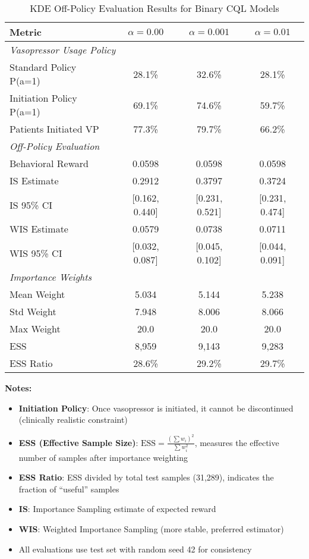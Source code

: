 \documentclass{article}
\begin{document}
\begin{table}[h]
\centering
\caption{KDE Off-Policy Evaluation Results for Binary CQL Models}
\label{tab:kde_ope_results}
\begin{tabular}{@{}lccc@{}}
\toprule
\textbf{Metric} & \textbf{$\alpha=0.00$} & \textbf{$\alpha=0.001$} & \textbf{$\alpha=0.01$} \\
\midrule
\multicolumn{4}{l}{\textit{Vasopressor Usage Policy}} \\
Standard Policy P(a=1) & 28.1\% & 32.6\% & 28.1\% \\
Initiation Policy P(a=1) & 69.1\% & 74.6\% & 59.7\% \\
Patients Initiated VP & 77.3\% & 79.7\% & 66.2\% \\
\midrule
\multicolumn{4}{l}{\textit{Off-Policy Evaluation}} \\
Behavioral Reward & 0.0598 & 0.0598 & 0.0598 \\
IS Estimate & 0.2912 & 0.3797 & 0.3724 \\
IS 95\% CI & [0.162, 0.440] & [0.231, 0.521] & [0.231, 0.474] \\
WIS Estimate & 0.0579 & 0.0738 & 0.0711 \\
WIS 95\% CI & [0.032, 0.087] & [0.045, 0.102] & [0.044, 0.091] \\
\midrule
\multicolumn{4}{l}{\textit{Importance Weights}} \\
Mean Weight & 5.034 & 5.144 & 5.238 \\
Std Weight & 7.948 & 8.006 & 8.066 \\
Max Weight & 20.0 & 20.0 & 20.0 \\
ESS & 8,959 & 9,143 & 9,283 \\
ESS Ratio & 28.6\% & 29.2\% & 29.7\% \\
\bottomrule
\end{tabular}
\end{table}

\bigskip

\textbf{Notes:}
\begin{itemize}
\item \textbf{Initiation Policy}: Once vasopressor is initiated, it cannot be discontinued (clinically realistic constraint)
\item \textbf{ESS (Effective Sample Size)}: $\text{ESS} = \frac{(\sum w_i)^2}{\sum w_i^2}$, measures the effective number of samples after importance weighting
\item \textbf{ESS Ratio}: ESS divided by total test samples (31,289), indicates the fraction of ``useful'' samples
\item \textbf{IS}: Importance Sampling estimate of expected reward
\item \textbf{WIS}: Weighted Importance Sampling (more stable, preferred estimator)
\item All evaluations use test set with random seed 42 for consistency
\end{itemize}
\end{document}
